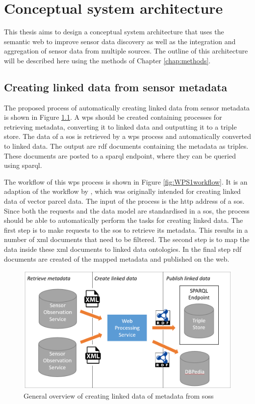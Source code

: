 

\chapter{Conceptual system architecture}
\label{chap:design}

This thesis aims to design a conceptual system architecture that uses the semantic web to improve sensor data discovery as well as the integration and aggregation of sensor data from multiple sources. The outline of this architecture will be described here using the methods of Chapter \ref{chap:methods}. 

\section{Creating linked data from sensor metadata}
\label{par:Architecture1}
The proposed process of automatically creating linked data from sensor metadata is shown in Figure \ref{fig:WPS1}. A \acf{wps} should be created containing processes for retrieving metadata, converting it to linked data and outputting it to a triple store. The data of a \ac{sos} is retrieved by a \ac{wps} process and automatically converted to linked data. The output are \ac{rdf} documents containing the metadata as triples. These documents are posted to a \ac{sparql} endpoint, where they can be queried using \ac{sparql}.  

The workflow of this \ac{wps} process is shown in Figure \ref{fig:WPS1workflow}. It is an adaption of the workflow by \cite{LD:Missier}, which was originally intended for creating linked data of vector parcel data. The input of the process is the \ac{http} address of a \ac{sos}. Since both the requests and the data model are standardised in a \ac{sos}, the process should be able to automatically perform the tasks for creating linked data. The first step is to make requests to the \ac{sos} to retrieve its metadata. This results in a number of \ac{xml} documents that need to be filtered. The second step is to map the data inside these \ac{xml} documents to linked data ontologies. In the final step \ac{rdf} documents are created of the mapped metadata and published on the web.  

\begin{figure}
	\centering
	\includegraphics[width=0.8\linewidth]{UML/wps1diagram2.PNG}
	\caption{General overview of creating linked data of metadata from \aclp*{sos}}
	\label{fig:WPS1}
\end{figure}

